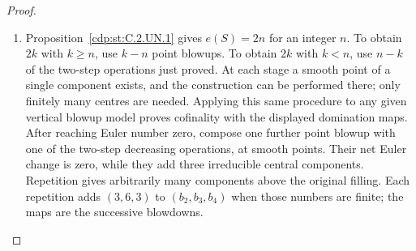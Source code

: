 \begin{proof}
\begin{enumerate}[label=\arabic*.,leftmargin=*]
\item Proposition~\ref{cdp:st:C.2.UN.1} gives $e(S)=2n$ for an integer $n$. To obtain $2k$
with $k\ge n$, use $k-n$ point blowups. To obtain $2k$ with $k<n$,
use $n-k$ of the two-step operations just proved. At each stage a
smooth point of a single component exists, and the construction
can be performed there; only finitely many centres are needed.
Applying this same procedure to any given vertical blowup model
proves cofinality with the displayed domination maps.
After reaching Euler number zero, compose one further point blowup
with one of the two-step decreasing operations, at smooth
points. Their net Euler change is zero, while they add three
irreducible central components. Repetition gives arbitrarily many
components above the original filling. Each repetition adds
$(3,6,3)$ to $(b_2,b_3,b_4)$ when those numbers are finite; the
maps are the successive blowdowns.

\end{enumerate}
\end{proof}